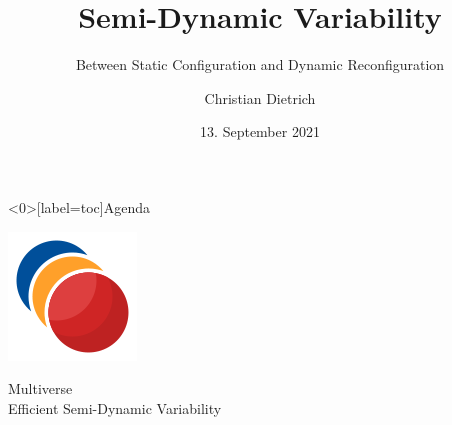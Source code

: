 \RequirePackage{luatex85}\documentclass[beamer,xcolor={table,rgb,dvipsnames}]{beamer}
\author{Christian Dietrich}
\date{13. September 2021}
\begin{document}
\subtitle{Between Static Configuration and Dynamic Reconfiguration}
\title{Semi-Dynamic Variability}


\begin{frame}[title]
  \maketitle
\end{frame}

\begin{frame}<0>[label=toc]{Agenda}

\begin{mdframed}[linecolor=safegreen!40,backgroundcolor=mvBG ,
                 linewidth=5pt,topline=false,rightline=false,bottomline=false,  innertopmargin=6pt, innerbottommargin=6pt, innerleftmargin=6pt, innerrightmargin=6pt]


  \begin{minipage}{0.1\linewidth}
    \includegraphics[width=\linewidth]{fig/multiverse.png}
  \end{minipage}\hfill%
  \begin{minipage}{0.87\linewidth}
  {\LARGE Multiverse}\\
  {\large Efficient Semi-Dynamic Variability}
\end{minipage}\\[1.5ex]


\end{mdframed}
\end{frame}
\end{document}
